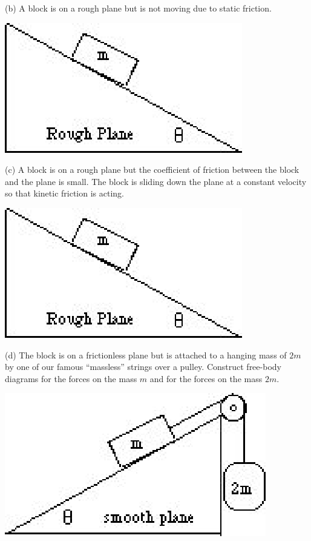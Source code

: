 (b) A block is on a rough plane but is not moving due to static friction.

\vspace{0.3cm}
{\par\centering \includegraphics{friction/friction_fig4.eps} \par}
\vspace{0.3cm}

(c) A block is on a rough plane but the coefficient of friction between the
block and the plane is small. The block is sliding down the plane at a constant
velocity so that kinetic friction is acting.

\vspace{0.3cm}
{\par\centering \includegraphics{friction/friction_fig4.eps} \par}
\vspace{0.3cm}

\pagebreak[2]
(d) The block is on a frictionless plane but is attached to a hanging mass of
$2m$ by one of our famous ``massless'' strings over a pulley.
Construct free-body diagrams for the forces on the mass $m$ and for the forces
on the mass $2m$.

\vspace{0.3cm}
{\par\centering \includegraphics{friction/friction_fig5.eps} \par}
\vspace{0.3cm}

